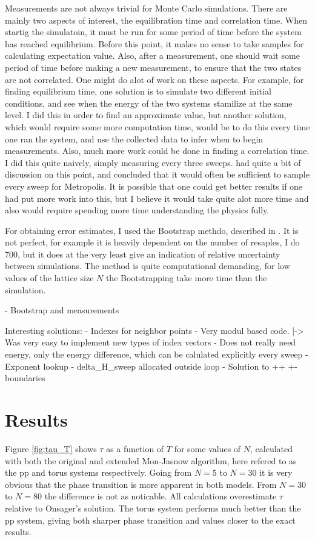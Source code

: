 \documentclass{article}
\begin{document}
Measurements are not always trivial for Monte Carlo simulations.
There are mainly two aspects of interest, the equilibration time and correlation time.
When startig the simulatoin, it must be run for some period of time before the system has reached equilibrium.
Before this point, it makes no sense to take samples for calculating expectation value.
Also, after a measurement, one should wait some period of time before making a new measurement, to ensure that the two states are not correlated.
One might do alot of work on these aspects.
For example, for finding equilibrium time, one solution is to simulate two different initial conditions, and see when the energy of the two systems stamilize at the same level.
I did this in order to find an approximate value, but another solution, which would require some more computation time, would be to do this every time one ran the system, and use the collected data to infer when to begin measurements.
Also, much more work could be done in finding a correlation time.
I did this quite naively, simply measuring every three sweeps.
\cite{niels} had quite a bit of discussion on this point, and concluded that it would often be sufficient to sample every sweep for Metropolis.
It is possible that one could get better results if one had put more work into this, but I believe it would take quite alot more time and also would require spending more time understanding the physics fully.

For obtaining error estimates, I used the Bootstrap methdo, described in \cite{niels}.
It is not perfect, for example it is heavily dependent on the number of resaples, I do 700, but it does at the very least give an indication of relative uncertainty between simulations.
The method is quite computational demanding, for low values of the lattice size $N$ the Bootstrapping take more time than the simulation.


- Bootstrap and measurements

Interesting solutions:
- Indexes for neighbor points
- Very modul based code.
  |-> Was very easy to implement new types of index vectors
- Does not really need energy, only the energy difference, which can be calulated explicitly every sweep
- Exponent lookup
- delta_H_sweep allocated outside loop
- Solution to ++ +- boundaries


\section{Results}
Figure \ref{fig:tau_T} shows $\tau$ as a function of $T$ for some values of $N$, calculated with both the original and extended Mon-Jasnow algorithm, here refered to as the pp and torus systems respectively.
Going from $N=5$ to $N=30$ it is very obvious that the phase transition is more apparent in both models.
From $N=30$ to $N=80$ the difference is not as noticable.
All calculations overestimate $\tau$ relative to Onsager's solution.
The torus system performs much better than the pp system, giving both sharper phase transition and values closer to the exact results.
\end{document}
